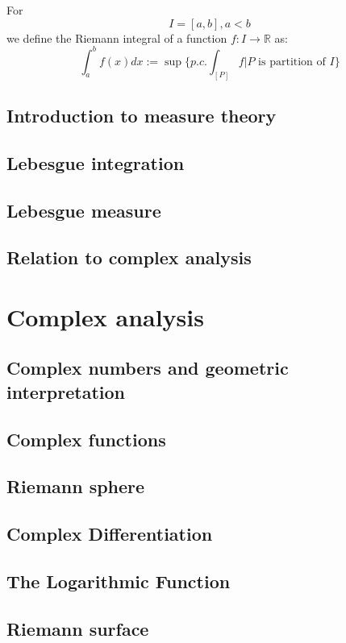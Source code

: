 \documentclass{article}
\newcommand{\R}{\mathbb{R}}
\begin{document}
\begin{definition}
  For $$I=[a,b], a<b$$ we define the Riemann integral of a function $f:I\to \R$ as:
  \begin{equation}
    \int_a^b f(x)dx:=\sup\{p.c.\int_{[P]}f|P \text{ is partition of } I\} 
  \end{equation}
\end{definition}




\subsection{Introduction to measure theory}
\subsection{Lebesgue integration}
\subsection{Lebesgue measure}
\subsection{Relation to complex analysis}



\section{Complex analysis}
\subsection{Complex numbers and geometric interpretation}
\subsection{Complex functions}
\subsection{Riemann sphere}
\subsection{Complex Differentiation}
\subsection{The Logarithmic Function}
\subsection{Riemann surface}
\end{document}
